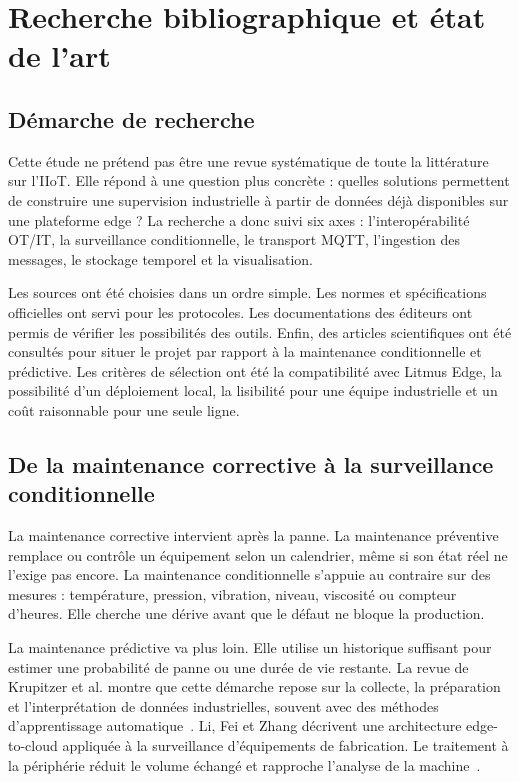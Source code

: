 \chapter{Recherche bibliographique et état de l'art}

\section{Démarche de recherche}

Cette étude ne prétend pas être une revue systématique de toute la
littérature sur l'IIoT. Elle répond à une question plus concrète : quelles
solutions permettent de construire une supervision industrielle à partir de
données déjà disponibles sur une plateforme edge ? La recherche a donc suivi
six axes : l'interopérabilité OT/IT, la surveillance conditionnelle, le
transport MQTT, l'ingestion des messages, le stockage temporel et la
visualisation.

Les sources ont été choisies dans un ordre simple. Les normes et
spécifications officielles ont servi pour les protocoles. Les documentations
des éditeurs ont permis de vérifier les possibilités des outils. Enfin, des
articles scientifiques ont été consultés pour situer le projet par rapport à
la maintenance conditionnelle et prédictive. Les critères de sélection ont
été la compatibilité avec Litmus Edge, la possibilité d'un déploiement local,
la lisibilité pour une équipe industrielle et un coût raisonnable pour une
seule ligne.

\section{De la maintenance corrective à la surveillance conditionnelle}

La maintenance corrective intervient après la panne. La maintenance
préventive remplace ou contrôle un équipement selon un calendrier, même si son
état réel ne l'exige pas encore. La maintenance conditionnelle s'appuie au
contraire sur des mesures : température, pression, vibration, niveau,
viscosité ou compteur d'heures. Elle cherche une dérive avant que le défaut ne
bloque la production.

La maintenance prédictive va plus loin. Elle utilise un historique suffisant
pour estimer une probabilité de panne ou une durée de vie restante. La revue
de Krupitzer et al. montre que cette démarche repose sur la collecte, la
préparation et l'interprétation de données industrielles, souvent avec des
méthodes d'apprentissage automatique~\cite{krupitzer2020survey}. Li, Fei et
Zhang décrivent une architecture edge-to-cloud appliquée à la surveillance
d'équipements de fabrication. Le traitement à la périphérie réduit le volume
échangé et rapproche l'analyse de la machine~\cite{li2022condition}.

